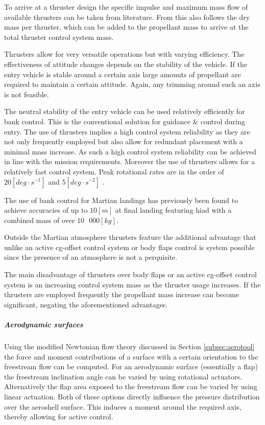 To arrive at a thruster design the specific impulse and maximum mass flow of available thrusters can be taken from literature. From this also follows the dry mass per thruster, which can be added to the propellant mass to arrive at the total thruster control system mass.

Thrusters allow for very versatile operations but with varying efficiency. The effectiveness of attitude changes depends on the stability of the vehicle. If the entry vehicle is stable around a certain axis large amounts of propellant are required to maintain a certain attitude. Again, any trimming around such an axis is not feasible.

The neutral stability of the entry vehicle can be used relatively efficiently for bank control. This is the conventional solution for guidance \& control during entry. The use of thrusters implies a high control system reliability as they are not only frequently employed but also allow for redundant placement with a minimal mass increase. As such a high control system reliability can be achieved in line with the mission requirements. Moreover the use of thrusters allows for a relatively fast control system. Peak rotational rates are in the order of $20 \left[deg\cdot s^{-1}\right]$ and $5 \left[deg \cdot s^{-2}\right]$ \cite{Davis2010}.

The use of bank control for Martian landings has previously been found \cite{Davis2010} to achieve accuracies of up to $10 \left[m\right]$ at final landing featuring \gls{hiad} with a combined mass of over $10\mbox{ }000 \left[kg\right]$.

Outside the Martian atmosphere thrusters feature the additional advantage that unlike an active \gls{cg}-offset control system or body flaps control is system possible since the presence of an atmosphere is not a perquisite.

The main disadvantage of thrusters over body flaps or an active \gls{cg}-offset control system is an increasing control system mass as the thruster usage increases. If the thrusters are employed frequently the propellant mass increase can become significant, negating the aforementioned advantages.


\subparagraph{Aerodynamic surfaces}

Using the modified Newtonian flow theory discussed in Section \ref{subsec:aerotool} the force and moment contributions of a surface with a certain orientation to the freestream flow can be computed. For an aerodynamic surface (essentially a flap) the freestream inclination angle can be varied by using rotational actuators. Alternatively the flap area exposed to the freestream flow can be varied by using linear actuation. Both of these options directly influence the pressure distribution over the aeroshell surface. This induces a moment around the required axis, thereby allowing for active control.

